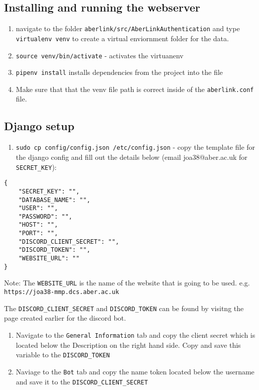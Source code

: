 \subsection{Installing and running the
webserver}\label{installing-and-running-the-webserver}

\begin{enumerate}
\def\labelenumi{\arabic{enumi}.}
\item
  navigate to the folder \texttt{aberlink/src/AberLinkAuthentication}
  and type \texttt{virtualenv venv} to create a virtual enviornment
  folder for the data.
\item
  \texttt{source venv/bin/activate} - activates the virtuanenv
\item
  \texttt{pipenv install} installs dependencies from the project into
  the file
\item
  Make sure that that the venv file path is correct inside of the
  \texttt{aberlink.conf} file.
\end{enumerate}

\subsection{Django setup}\label{django-setup}

\begin{enumerate}
\def\labelenumi{\arabic{enumi}.}
\itemsep1pt\parskip0pt
\item
  \texttt{sudo cp config/config.json /etc/config.json} - copy the
  template file for the django config and fill out the details below
  (email joa38@aber.ac.uk for \texttt{SECRET\_KEY}):
\end{enumerate}

\begin{lstlisting}
{
    "SECRET_KEY": "",
    "DATABASE_NAME": "",
    "USER": "",
    "PASSWORD": "",
    "HOST": "",
    "PORT": "",
    "DISCORD_CLIENT_SECRET": "",
    "DISCORD_TOKEN": "",
    "WEBSITE_URL": ""
}
\end{lstlisting}
Note: The \texttt{WEBSITE\_URL} is the name of the website that is going
to be used. e.g. \texttt{https://joa38-mmp.dcs.aber.ac.uk}

The \texttt{DISCORD\_CLIENT\_SECRET} and \texttt{DISCORD\_TOKEN} can be
found by visitng the page created earlier for the discord bot.

\begin{enumerate}
\def\labelenumi{\arabic{enumi}.}
\item
  Navigate to the \texttt{General Information} tab and copy the client
  secret which is located below the Description on the right hand side.
  Copy and save this variable to the \texttt{DISCORD\_TOKEN}
\item
  Naviage to the \texttt{Bot} tab and copy the name token located below
  the username and save it to the \texttt{DISCORD\_CLIENT\_SECRET}
\end{enumerate}

